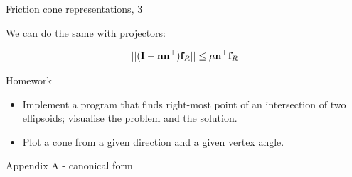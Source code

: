 \documentclass{beamer}
\begin{document}
\begin{frame}{Friction cone representations, 3}
	\begin{flushleft}
		
		We can do the same with projectors:
		
		
		\begin{equation}
			|| (\mathbf{I} - \mathbf{n}\mathbf{n}^\top) \mathbf{f}_R ||
			\leq \mu \mathbf{n}^\top \mathbf{f}_R
		\end{equation}
		
		
		
	\end{flushleft}
\end{frame}




\begin{frame}{Homework}
\begin{flushleft}

\begin{itemize}
	\item Implement a program that finds right-most point of an intersection of two ellipsoids; visualise the problem and the solution.
	
	\item Plot a cone from a given direction and a given vertex angle.
\end{itemize}




\end{flushleft}
\end{frame}





\myqrframe



\begin{frame}
	\centerline{\huge Appendix A - canonical form}
\end{frame}
\end{document}
